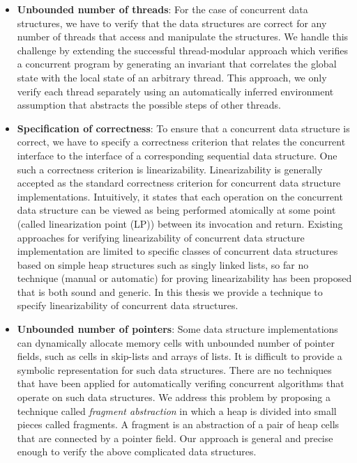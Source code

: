 \begin{itemize}
\item {\bf Unbounded number of threads}: For the case of concurrent data structures, we have to verify that the data structures are correct for any number of threads that access and manipulate the structures. We handle this challenge by extending the successful
thread-modular approach which verifies a concurrent program by generating
an invariant that correlates the global state with the local state of an arbitrary thread. This approach, we only verify each thread
separately using an automatically inferred environment assumption that
abstracts the possible steps of other threads.
\item {\bf Specification of correctness}: To ensure that a concurrent data structure is correct, we have to specify a correctness criterion that relates the concurrent interface to the interface of a corresponding sequential data structure.  One such a correctness criterion is linearizability. Linearizability is generally accepted as the standard correctness criterion for concurrent data structure implementations. Intuitively, it states that each operation on the concurrent data structure can be viewed as being performed atomically at some point (called linearization point (LP)) between its invocation and return. Existing approaches for verifying linearizability of concurrent data structure implementation are limited to specific classes of concurrent data structures based on simple heap structures such as singly linked lists, so far no technique (manual or automatic) for proving linearizability has been proposed that is both sound and generic. In this thesis we provide a technique to specify linearizability of concurrent data structures. 
\item {\bf Unbounded number of pointers}: Some data structure implementations can dynamically allocate memory cells with unbounded number of pointer fields,  such as cells in skip-lists and arrays of lists. It is difficult to provide a symbolic representation for such data structures. There are no techniques that have been applied for automatically verifing concurrent algorithms that operate on such data structures. We address this problem by proposing a technique called \emph{fragment abstraction} in which a heap is divided into small pieces called fragments. A fragment is an abstraction
of a pair of heap cells that are connected by a pointer field. Our approach is general and precise enough to verify the above complicated data structures. 
\end{itemize}

